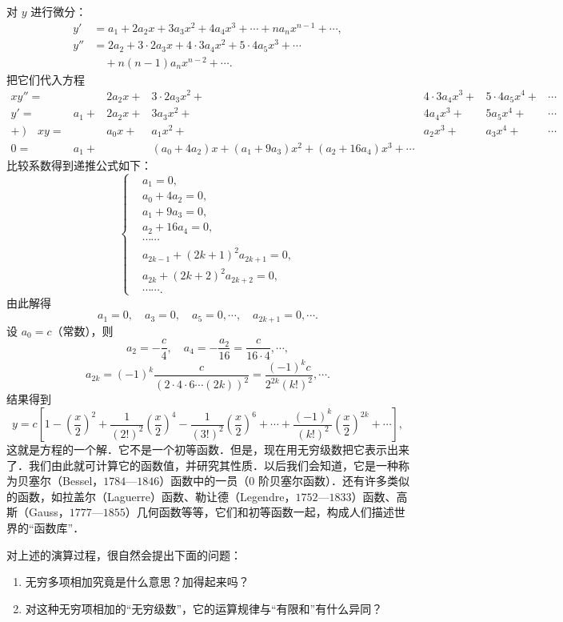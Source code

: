 对 $y$ 进行微分：
\[
\begin{aligned}
y'&=a_{1}+2a_{2}x+3a_{3}x^{2}+4a_{4}x^{3}+\cdots+na_{n}x^{n-1}+\cdots,\\
y''&=2a_{2}+3\cdot2a_{3}x+4\cdot3a_{4}x^{2}+5\cdot4a_{5}x^{3}+\cdots\\
&\quad +n(n-1)a_{n}x^{n-2}+\cdots.
\end{aligned}
\]
把它们代入方程
\[
\begin{array}{rccccccl}
xy''=&&2a_{2}x+&3\cdot2a_{3}x^{2}+&4\cdot3a_{4}x^{3}+&5\cdot4a_{5}x^{4}+&\cdots\\
y'= &a_{1}+&2a_{2}x+&3a_{3}x^{2}+&4a_{4}x^{3}+&5a_{5}x^{4}+&\cdots\\
+\ )\quad xy=&&a_{0}x+&a_{1}x^{2}+&a_{2}x^{3}+&a_{3}x^{4}+&\cdots\\ \hline
0=&a_{1}+&&(a_{0}+4a_{2})x+(a_{1}+9a_{3})x^{2}+(a_{2}+16a_{4})x^{3}+\cdots
\end{array}
\]
比较系数得到递推公式如下：
\[
\left\{
\begin{aligned}
&a_{1}=0,\\
&a_{0}+4a_{2}=0,\\
&a_{1}+9a_{3}=0,\\
&a_{2}+16a_{4}=0,\\
&\cdots\cdots\\
&a_{2k-1}+(2k+1)^{2}a_{2k+1}=0,\\
&a_{2k}+(2k+2)^{2}a_{2k+2}=0,\\
&\cdots\cdots.
\end{aligned}
\right.
\]
由此解得
\[
a_{1}=0,\quad a_{3}=0,\quad a_{5}=0,\cdots,\quad a_{2k+1}=0,\cdots.
\]
设 $a_{0}=c$（常数），则
\[
a_{2}=-\frac{c}{4},\quad a_{4}=-\frac{a_{2}}{16}=\frac{c}{16\cdot4},\cdots,
\]
\[
a_{2k}=(-1)^{k}\frac{c}{(2\cdot4\cdot6\cdots(2k))^{2}}=\frac{(-1)^{k}c}{2^{2k}(k!)^{2}},\cdots.
\]
结果得到
\[
y=c\left[1-\left(\frac{x}{2}\right)^{2}+\frac{1}{(2!)^{2}}\left(\frac{x}{2}\right)^{4}-\frac{1}{(3!)^{2}}\left(\frac{x}{2}\right)^{6}+\cdots+\frac{(-1)^{k}}{(k!)^{2}}\left(\frac{x}{2}\right)^{2k}+\cdots\right],
\]
这就是方程的一个解．它不是一个初等函数．但是，现在用无穷级数把它表示出来了．我们由此就可计算它的函数值，并研究其性质．以后我们会知道，它是一种称为贝塞尔（Bessel，$1784$—$1846$）函数中的一员（$0$ 阶贝塞尔函数）．还有许多类似的函数，如拉盖尔（Laguerre）函数、勒让德（Legendre，$1752$—$1833$）函数、高斯（Gauss，$1777$—$1855$）几何函数等等，它们和初等函数一起，构成人们描述世界的``函数库''．

对上述的演算过程，很自然会提出下面的问题：
\begin{enumerate}[label=（\arabic*）]
\item 无穷多项相加究竟是什么意思？加得起来吗？
\item 对这种无穷项相加的``无穷级数''，它的运算规律与``有限和''有什么异同？
\end{enumerate}

